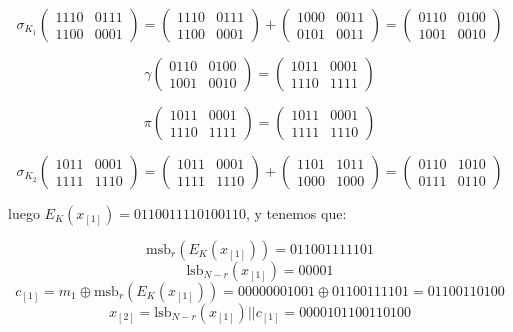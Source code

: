 \documentclass[a4paper]{article}
\begin{document}
$$\sigma_{K_1} \begin{pmatrix} 1110 & 0111 \\ 1100 & 0001 \end{pmatrix} = \begin{pmatrix} 1110 & 0111 \\ 1100 & 0001 \end{pmatrix} + \begin{pmatrix} 1000 & 0011 \\ 0101 & 0011 \end{pmatrix} = \begin{pmatrix} 0110 & 0100 \\ 1001 & 0010 \end{pmatrix}$$

$$\gamma \begin{pmatrix} 0110 & 0100 \\ 1001 & 0010 \end{pmatrix} = \begin{pmatrix} 1011 & 0001 \\ 1110 & 1111 \end{pmatrix}$$

$$\pi \begin{pmatrix} 1011 & 0001 \\ 1110 & 1111 \end{pmatrix} = \begin{pmatrix} 1011 & 0001 \\ 1111 & 1110 \end{pmatrix}$$

$$\sigma_{K_2} \begin{pmatrix} 1011 & 0001 \\ 1111 & 1110 \end{pmatrix} = \begin{pmatrix} 1011 & 0001 \\ 1111 & 1110 \end{pmatrix} + \begin{pmatrix} 1101 & 1011 \\ 1000 & 1000 \end{pmatrix} = \begin{pmatrix} 0110 & 1010 \\ 0111 & 0110 \end{pmatrix}$$


luego $E_K(x_{[1]}) = 0110 0111 1010 0110$, y tenemos que:

$$\text{msb}_r (E_K(x_{[1]})) = 0110 01111 101$$
$$\text{lsb}_{N-r} (x_{[1]}) = 00001$$
$$c_{[1]} = m_1 \oplus \text{msb}_r(E_K(x_{[1]})) = 0000 0001 001 \oplus 0110 0111 101 = 0110 0110 100$$
$$x_{[2]} = \text{lsb}_{N-r} (x_{[1]}) || c_{[1]} = 0000 1011 0011 0100$$
\end{document}
